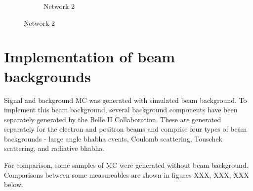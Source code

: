\documentclass[12pt]{thesis}  %
\begin{document}
\begin{figure}[h]
\begin{subfigure}[b]{0.475\textwidth}
            \caption[]%
            {{\small Network 2}}    
            \label{fig:mean and std of net24}
        \end{subfigure}
    \end{figure}



\section{Implementation of beam backgrounds}

Signal and background MC was generated with simulated beam background. To implement this beam background, several background components have been separately generated by the Belle II Collaboration. These are generated separately for the electron and positron beams and comprise four  types of beam backgrounds - large angle bhabha events, Coulomb scattering, Touschek scattering, and radiative bhabha.

For comparison, some samples of MC were generated without beam background. Comparisons between some measureables are shown in figures XXX, XXX, XXX below.
\end{document}
